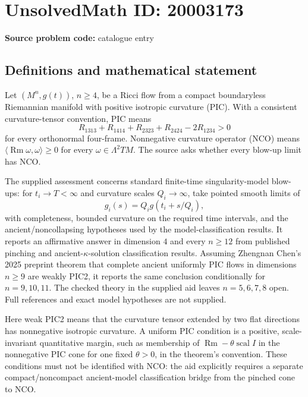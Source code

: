 \documentclass[11pt]{article}
\begin{document}
\section*{UnsolvedMath ID: 20003173}
\textbf{Source problem code:} catalogue entry
\subsection{Definitions and mathematical statement}
Let $(M^n,g(t))$, $n\geq4$, be a Ricci flow from a compact boundaryless Riemannian manifold with positive isotropic curvature (PIC). With a consistent curvature-tensor convention, PIC means
\[
 R_{1313}+R_{1414}+R_{2323}+R_{2424}-2R_{1234}>0
\]
for every orthonormal four-frame. Nonnegative curvature operator (NCO) means $\langle\operatorname{Rm}\omega,\omega\rangle\geq0$ for every $\omega\in\Lambda^2TM$. The source asks whether every blow-up limit has NCO.

The supplied assessment concerns standard finite-time singularity-model blow-ups: for $t_i\to T<\infty$ and curvature scales $Q_i\to\infty$, take pointed smooth limits of
\[
 g_i(s)=Q_i g(t_i+s/Q_i),
\]
with completeness, bounded curvature on the required time intervals, and the ancient/noncollapsing hypotheses used by the model-classification results. It reports an affirmative answer in dimension $4$ and every $n\geq12$ from published pinching and ancient-$\kappa$-solution classification results. Assuming Zhengnan Chen's 2025 preprint theorem that complete ancient uniformly PIC flows in dimensions $n\geq9$ are weakly PIC2, it reports the same conclusion conditionally for $n=9,10,11$. The checked theory in the supplied aid leaves $n=5,6,7,8$ open. Full references and exact model hypotheses are not supplied.

Here weak PIC2 means that the curvature tensor extended by two flat directions has nonnegative isotropic curvature. A uniform PIC condition is a positive, scale-invariant quantitative margin, such as membership of $\operatorname{Rm}-\theta\operatorname{scal}I$ in the nonnegative PIC cone for one fixed $\theta>0$, in the theorem's convention. These conditions must not be identified with NCO: the aid explicitly requires a separate compact/noncompact ancient-model classification bridge from the pinched cone to NCO.
\end{document}
